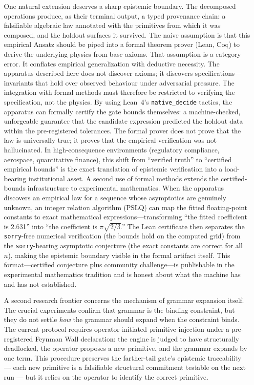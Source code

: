 \documentclass[11pt]{article}
\begin{document}
One natural extension deserves a sharp epistemic boundary. The decomposed operations produce, as their terminal output, a typed provenance chain: a falsifiable algebraic law annotated with the primitives from which it was composed, and the holdout surfaces it survived. The naive assumption is that this empirical Ansatz should be piped into a formal theorem prover (Lean, Coq) to derive the underlying physics from base axioms. That assumption is a category error. It conflates empirical generalization with deductive necessity. The apparatus described here does not discover axioms; it discovers specifications---invariants that hold over observed behaviour under adversarial pressure. The integration with formal methods must therefore be restricted to verifying the specification, not the physics. By using Lean~4's \texttt{native\_decide} tactics, the apparatus can formally certify the gate bounds themselves: a machine-checked, unforgeable guarantee that the candidate expression predicted the holdout data within the pre-registered tolerances. The formal prover does not prove that the law is universally true; it proves that the empirical verification was not hallucinated. In high-consequence environments (regulatory compliance, aerospace, quantitative finance), this shift from ``verified truth'' to ``certified empirical bounds'' is the exact translation of epistemic verification into a load-bearing institutional asset. A second use of formal methods extends the certified-bounds infrastructure to experimental mathematics. When the apparatus discovers an empirical law for a sequence whose asymptotics are genuinely unknown, an integer relation algorithm (PSLQ) can map the fitted floating-point constants to exact mathematical expressions---transforming ``the fitted coefficient is 2.631'' into ``the coefficient is $\pi\sqrt{2/3}$.'' The Lean certificate then separates the \texttt{sorry}-free numerical verification (the bounds hold on the computed grid) from the \texttt{sorry}-bearing asymptotic conjecture (the exact constants are correct for all~$n$), making the epistemic boundary visible in the formal artifact itself. This format---certified conjecture plus community challenge---is publishable in the experimental mathematics tradition and is honest about what the machine has and has not established.

A second research frontier concerns the mechanism of grammar expansion itself. The crucial experiments confirm that grammar is the binding constraint, but they do not settle \emph{how} the grammar should expand when the constraint binds. The current protocol requires operator-initiated primitive injection under a pre-registered Feynman Wall declaration: the engine is judged to have structurally deadlocked, the operator proposes a new primitive, and the grammar expands by one term. This procedure preserves the farther-tail gate's epistemic traceability --- each new primitive is a falsifiable structural commitment testable on the next run --- but it relies on the operator to identify the correct primitive.
\end{document}
